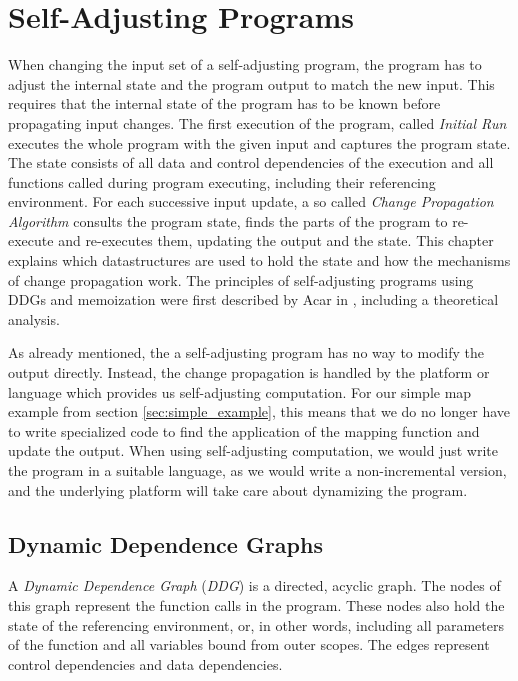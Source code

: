 
\chapter{Self-Adjusting Programs}
\label{ch:self_adjusting}

When changing the input set of a self-adjusting program, the program has to adjust the internal state and the program output to match the new input. This requires that the internal state of the program has to be known before propagating input changes. The first execution of the program, called \textit{Initial Run} executes the whole program with the given input and captures the program state. The state consists of all data and control dependencies of the execution and all functions called during program executing, including their referencing environment. 
For each successive input update, a so called \textit{Change Propagation Algorithm} consults the program state, finds the parts of the program to re-execute and re-executes them, updating the output and the state.  
This chapter explains which datastructures are used to hold the state and how the mechanisms of change propagation work. The principles of self-adjusting programs using DDGs and memoization were first described by Acar in \cite{Acar2005thesis}, including a theoretical analysis. 

As already mentioned, the a self-adjusting program has no way to modify the output directly. Instead, the change propagation is handled by the platform or language which provides us self-adjusting computation. For our simple map example from section \ref{sec:simple_example}, this means that we do no longer have to write specialized code to find the application of the mapping function and update the output. When using self-adjusting computation, we would just write the program in a suitable language, as we would write a non-incremental version, and the underlying platform will take care about dynamizing the program.

\section{Dynamic Dependence Graphs}

A \textit{Dynamic Dependence Graph} (\textit{DDG}) is a directed, acyclic graph. The nodes of this graph represent the function calls in the program. These nodes also hold the state of the referencing environment, or, in other words, including all parameters of the function and all variables bound from outer scopes. The edges represent control dependencies and data dependencies. 

